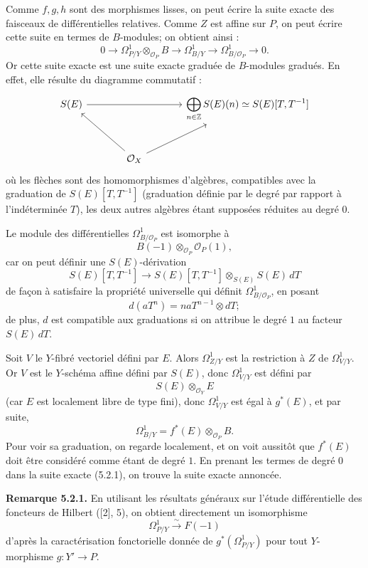 \documentclass[11pt]{article}
\begin{document}
Comme \(f,g,h\) sont des morphismes lisses, on peut écrire la suite exacte des faisceaux de différentielles relatives. Comme \(Z\) est affine sur \(P\), on peut écrire cette suite en termes de \(B\)-modules; on obtient ainsi :
\begin{equation}\tag{5.2.1}
0\longrightarrow
 \Omega^1_{P/Y}\otimes_{\mathcal O_P}B
\longrightarrow
 \Omega^1_{B/Y}
\longrightarrow
 \Omega^1_{B/\mathcal O_P}
\longrightarrow0 .
\end{equation}
Or cette suite exacte est une suite exacte graduée de \(B\)-modules gradués. En effet, elle résulte du diagramme commutatif :
\[
\begin{tikzcd}[column sep=large,row sep=large]
S(E) \arrow[rr] && \displaystyle\bigoplus_{n\in\mathbb Z}S(E)(n)\simeq S(E)[T,T^{-1}]\\
& \mathcal O_X \arrow[ul] \arrow[ur] &
\end{tikzcd}
\]
où les flèches sont des homomorphismes d'algèbres, compatibles avec la graduation de \(S(E)[T,T^{-1}]\) (graduation définie par le degré par rapport à l'indéterminée \(T\)), les deux autres algèbres étant supposées réduites au degré \(0\).

Le module des différentielles \(\Omega^1_{B/\mathcal O_P}\) est isomorphe à
\[
 B(-1)\otimes_{\mathcal O_P}\mathcal O_P(1),
\]
car on peut définir une \(S(E)\)-dérivation
\[
S(E)[T,T^{-1}]
\longrightarrow
S(E)[T,T^{-1}]\otimes_{S(E)}S(E)\,dT
\]
de façon à satisfaire la propriété universelle qui définit \(\Omega^1_{B/\mathcal O_P}\), en posant
\[
 d(aT^n)=naT^{n-1}\otimes dT;
\]
de plus, \(d\) est compatible aux graduations si on attribue le degré \(1\) au facteur \(S(E)\,dT\).

Soit \(V\) le \(Y\)-fibré vectoriel défini par \(E\). Alors \(\Omega^1_{Z/Y}\) est la restriction à \(Z\) de \(\Omega^1_{V/Y}\). Or \(V\) est le \(Y\)-schéma affine défini par \(S(E)\), donc \(\Omega^1_{V/Y}\) est défini par
\[
S(E)\otimes_{\mathcal O_Y}E
\]
(car \(E\) est localement libre de type fini), donc \(\Omega^1_{V/Y}\) est égal à \(g^*(E)\), et par suite,
\[
\Omega^1_{B/Y}=f^*(E)\otimes_{\mathcal O_P}B.
\]
Pour voir sa graduation, on regarde localement, et on voit aussitôt que \(f^*(E)\) doit être considéré comme étant de degré \(1\). En prenant les termes de degré \(0\) dans la suite exacte (5.2.1), on trouve la suite exacte annoncée.

\textbf{Remarque 5.2.1.} En utilisant les résultats généraux sur l'étude différentielle des foncteurs de Hilbert ([2], 5), on obtient directement un isomorphisme
\[
\Omega^1_{P/Y}\xrightarrow{\sim}F(-1)
\]
d'après la caractérisation fonctorielle donnée de \(g^*(\Omega^1_{P/Y})\) pour tout \(Y\)-morphisme \(g:Y'\to P\).
\end{document}
